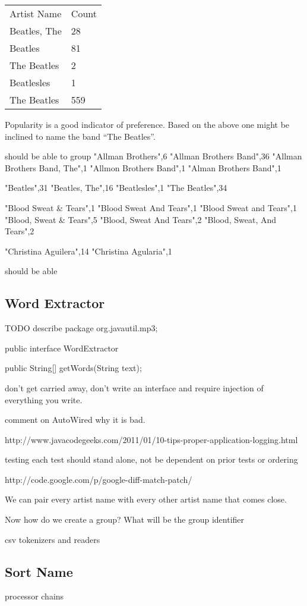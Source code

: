 \documentclass[a4paper,10pt]{book}
\begin{document}
\begin{tabular}{l | l}
Artist Name	& Count \\ 
Beatles, The	& 28 \\
Beatles	 & 81 \\
 The Beatles	& 2 \\
Beatlesles	& 1 \\
The Beatles	& 559
\end{tabular} 

Popularity is a good indicator of preference. 
Based on the above one might be inclined to name the band ``The Beatles''.  

should be able to group
"Allman Brothers",6
"Allman Brothers Band",36
"Allman Brothers Band, The",1
"Allmon Brothers Band",1
"Alman Brothers Band",1

"Beatles",31
"Beatles, The",16
"Beatlesles",1
"The Beatles",34

"Blood Sweat & Tears",1
"Blood Sweat And Tears",1
"Blood Sweat and Tears",1
"Blood, Sweat & Tears",5
"Blood, Sweat And Tears",2
"Blood, Sweat, And Tears",2

"Christina Aguilera",14
"Christina Agularia",1


should be able 

\subsection{Word Extractor}
TODO describe
package org.javautil.mp3;

public interface WordExtractor {
	
	public String[] getWords(String text);
}

don't get carried away, don't write an interface and require injection of everything you write.

comment on AutoWired why it is bad.

http://www.javacodegeeks.com/2011/01/10-tips-proper-application-logging.html

testing each test should stand alone, not be dependent on prior tests or ordering

http://code.google.com/p/google-diff-match-patch/

We can pair every artist name with every other artist name that comes close.

Now how do we create a group?  What will be the group identifier

csv tokenizers and readers

\subsection{Sort Name}
processor chains 
\end{document}
